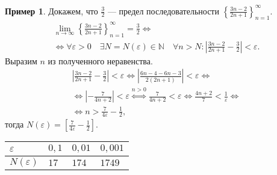 \documentclass[a4paper,12pt]{article} %
\theoremstyle{remark}
\theoremstyle{definition}
\newtheorem{exmp}{Пример}[section]
\begin{document}
\begin{exmp}
    Докажем, что $\displaystyle \frac{3}{2}$ --- предел последовательности 
    $\displaystyle \left\{\frac{3n-2}{2n+1}\right\}_{n=1}^{\infty}$.
    \begin{multline}
        \lim_{n \to \infty} \left\{\frac{3n-2}{2n+1}\right\}_{n=1}^{\infty} = \frac{3}{2} \iff \\
        \iff \forall \varepsilon>0 \quad \exists N=N(\varepsilon)\in \mathbb{N} \quad \forall n>N : \left|\frac{3n-2}{2n+1} 
        - \frac{3}{2}\right| < \varepsilon.
    \end{multline}
    Выразим $n$ из полученного неравенства.
    \begin{multline}
        \left|\frac{3n-2}{2n+1} - \frac{3}{2}\right| < \varepsilon \iff \left|\frac{6n-4-6n-3}{2(2n+1)}\right| < \varepsilon 
        \iff \\ \iff \left|-\frac{7}{4n+2}\right| <\varepsilon \overset{n>0}{\iff} \frac{7}{4n+2} < \varepsilon \iff 
        \frac{4n+2}{7} < \frac{1}{\varepsilon} \iff \\
        \iff n > \frac{7}{4\varepsilon} - \frac{1}{2},
    \end{multline}
    тогда $\displaystyle N(\varepsilon) = \left[\frac{7}{4\varepsilon} - \frac{1}{2}\right]$.

    \begin{table}[ht]
        \centering
        \begin{tabular}{|p{1cm}| p{1cm} | p{1cm} | p{1cm} |}
            \hline
            $\varepsilon$ & $0,1$ & $0,01$ & $0,001$ \\
            \hline
            $N(\varepsilon)$ & $17$ & $174$ & $1749$ \\
            \hline
        \end{tabular}
    \end{table}
\end{exmp}
\end{document}

